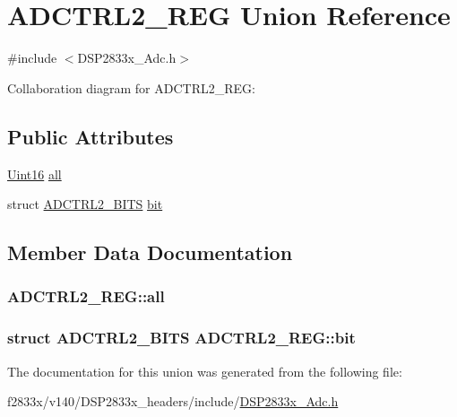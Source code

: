 \hypertarget{union_a_d_c_t_r_l2___r_e_g}{}\section{A\+D\+C\+T\+R\+L2\+\_\+\+R\+E\+G Union Reference}
\label{union_a_d_c_t_r_l2___r_e_g}


{\ttfamily \#include $<$D\+S\+P2833x\+\_\+\+Adc.\+h$>$}



Collaboration diagram for A\+D\+C\+T\+R\+L2\+\_\+\+R\+E\+G\+:
\subsection*{Public Attributes}
\begin{DoxyCompactItemize}
\item 
\hyperlink{_d_s_p2833x___device_8h_a59a9f6be4562c327cbfb4f7e8e18f08b}{Uint16} \hyperlink{union_a_d_c_t_r_l2___r_e_g_a58b1cf8b1da3f10eeb9f0f36fa903f6a}{all}
\item 
struct \hyperlink{struct_a_d_c_t_r_l2___b_i_t_s}{A\+D\+C\+T\+R\+L2\+\_\+\+B\+I\+T\+S} \hyperlink{union_a_d_c_t_r_l2___r_e_g_a59670c7085131d15919a940ff48f96f5}{bit}
\end{DoxyCompactItemize}


\subsection{Member Data Documentation}
\hypertarget{union_a_d_c_t_r_l2___r_e_g_a58b1cf8b1da3f10eeb9f0f36fa903f6a}{}
\subsubsection[{all}]{ A\+D\+C\+T\+R\+L2\+\_\+\+R\+E\+G\+::all}\label{union_a_d_c_t_r_l2___r_e_g_a58b1cf8b1da3f10eeb9f0f36fa903f6a}
\hypertarget{union_a_d_c_t_r_l2___r_e_g_a59670c7085131d15919a940ff48f96f5}{}
\subsubsection[{bit}]{\setlength{\rightskip}{0pt plus 5cm}struct {\bf A\+D\+C\+T\+R\+L2\+\_\+\+B\+I\+T\+S} A\+D\+C\+T\+R\+L2\+\_\+\+R\+E\+G\+::bit}\label{union_a_d_c_t_r_l2___r_e_g_a59670c7085131d15919a940ff48f96f5}


The documentation for this union was generated from the following file\+:\begin{DoxyCompactItemize}
\item 
f2833x/v140/\+D\+S\+P2833x\+\_\+headers/include/\hyperlink{_d_s_p2833x___adc_8h}{D\+S\+P2833x\+\_\+\+Adc.\+h}\end{DoxyCompactItemize}

